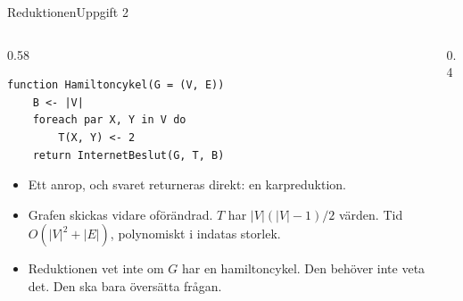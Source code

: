 \documentclass[aspectratio=169,10pt]{beamer}
\begin{document}
\begin{frame}[fragile]{Reduktionen}{Uppgift 2}
  \begin{columns}[T]
    \begin{column}{0.58\textwidth}
\begin{lstlisting}
function Hamiltoncykel(G = (V, E))
    B <- |V|
    foreach par X, Y in V do
        T(X, Y) <- 2
    return InternetBeslut(G, T, B)
\end{lstlisting}
      \begin{itemize}
        \item<2-> Ett anrop, och svaret returneras direkt: en karpreduktion.
        \item<3-> Grafen skickas vidare oförändrad. $T$ har $|V|(|V|-1)/2$ värden. Tid $O(|V|^2+|E|)$, polynomiskt i indatas storlek.
        \item<4-> Reduktionen vet inte om $G$ har en hamiltoncykel. Den behöver inte veta det. Den ska bara översätta frågan.
      \end{itemize}
    \end{column}
    \begin{column}{0.4\textwidth}
      \centering
    \end{column}
  \end{columns}
\end{frame}
\end{document}
